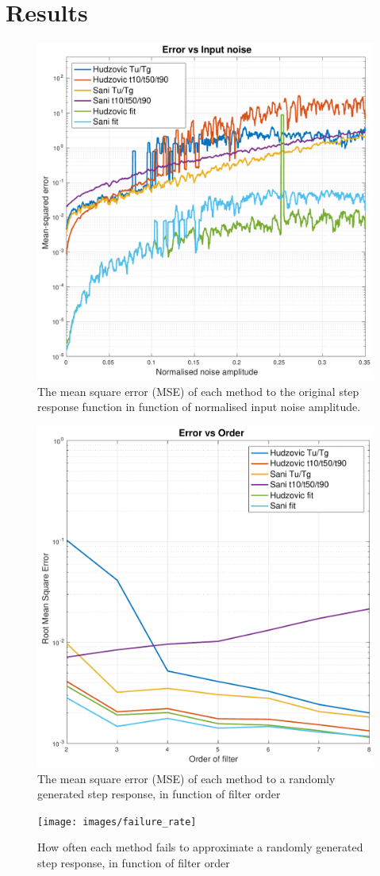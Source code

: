 \section{Results}

\begin{figure}
    \includegraphics[width=\linewidth]{images/error_noise}
    \caption{The mean square error (MSE) of each method to the original step response function in function of normalised input noise amplitude.}
\end{figure}

\begin{figure}
    \includegraphics[width=\linewidth]{images/error_order}
    \caption{The mean square error (MSE) of each method to a randomly generated step response, in function of filter order}
\end{figure}

\begin{figure}
    \texttt{[image: images/failure\_rate]}
    \caption{How often each method fails to approximate a randomly generated step response, in function of filter order}
\end{figure}


